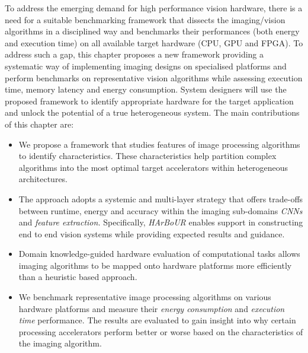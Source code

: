 To address the emerging demand for high performance vision hardware, there is a need for a suitable benchmarking framework that dissects the imaging/vision algorithms in a disciplined way and benchmarks their performances (both energy and execution time) on all available target hardware (\eg CPU, GPU and FPGA). To address such a gap, this chapter proposes a new framework providing a systematic way of implementing imaging designs on specialised platforms and perform benchmarks on representative vision algorithms while assessing execution time, memory latency and energy consumption. System designers will use the proposed framework to identify appropriate hardware for the target application and unlock the potential of a true heterogeneous system. The main contributions of this chapter are:
\begin{itemize}
\item We propose a framework that studies features of image processing algorithms to identify characteristics. These characteristics help partition complex algorithms into the most optimal target accelerators within heterogeneous architectures.

\item The approach adopts a systemic and multi-layer strategy that offers trade-offs between runtime, energy and accuracy within the imaging sub-domains \eg \textit{CNNs} and \textit{feature extraction.} Specifically, \textit{HArBoUR} enables support in constructing end to end vision systems while providing expected results and guidance.

\item Domain knowledge-guided hardware evaluation of computational tasks allows imaging algorithms to be mapped onto hardware platforms more efficiently than a heuristic based approach.

\item We benchmark representative image processing algorithms on various hardware platforms and measure their \emph{energy consumption} and \emph{execution time} performance. The results are evaluated to gain insight into why certain processing accelerators perform better or worse based on the characteristics of the imaging algorithm.
  
\end{itemize}





